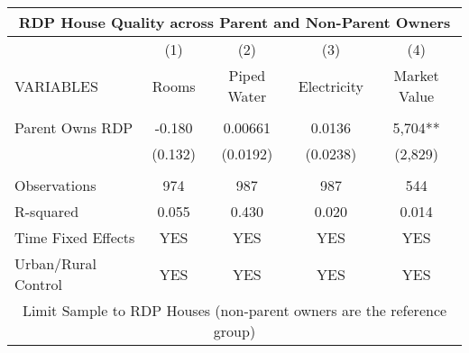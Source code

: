 \begin{tabular}{lcccc}
\multicolumn{5}{c}{RDP House Quality across Parent and Non-Parent Owners} \\ \hline
 & (1) & (2) & (3) & (4) \\
VARIABLES & Rooms & Piped Water & Electricity & Market Value \\ \hline
 &  &  &  &  \\
Parent Owns RDP & -0.180 & 0.00661 & 0.0136 & 5,704** \\
 & (0.132) & (0.0192) & (0.0238) & (2,829) \\
 &  &  &  &  \\
Observations & 974 & 987 & 987 & 544 \\
R-squared & 0.055 & 0.430 & 0.020 & 0.014 \\
Time Fixed Effects & YES & YES & YES & YES \\
 Urban/Rural Control & YES & YES & YES & YES \\ \hline
\multicolumn{5}{c}{ Limit Sample to RDP Houses (non-parent owners are the reference group)} \\
\end{tabular}
